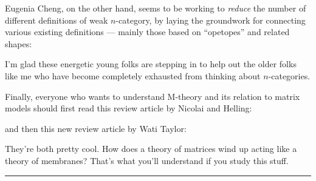 \documentclass{article}
\def\tightlist{}
\renewcommand{\texttt}[1]{%
  \begingroup
  \ttfamily
  \begingroup\lccode`~=`/\lowercase{\endgroup\def~}{/\discretionary{}{}{}}%
  \begingroup\lccode`~=`[\lowercase{\endgroup\def~}{[\discretionary{}{}{}}%
  \begingroup\lccode`~=`.\lowercase{\endgroup\def~}{.\discretionary{}{}{}}%
  \catcode`/=\active\catcode`[=\active\catcode`.=\active
  \scantokens{#1\noexpand}%
  \endgroup
}
\begin{document}
Eugenia Cheng, on the other hand, seems to be working to \emph{reduce}
the number of different definitions of weak \(n\)-category, by laying
the groundwork for connecting various existing definitions --- mainly
those based on ``opetopes'' and related shapes:


I'm glad these energetic young folks are stepping in to help out the
older folks like me who have become completely exhausted from thinking
about \(n\)-categories.

Finally, everyone who wants to understand M-theory and its relation to
matrix models should first read this review article by Nicolai and
Helling:


and then this new review article by Wati Taylor:


They're both pretty cool. How does a theory of matrices wind up acting
like a theory of membranes? That's what you'll understand if you study
this stuff.

\begin{center}\rule{0.5\linewidth}{0.5pt}\end{center}
\end{document}
